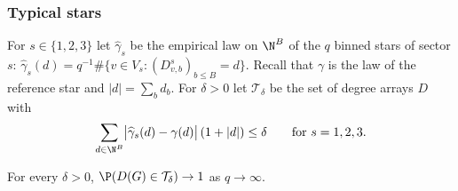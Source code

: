 \subsubsection*{Typical stars}
For $s\in\{1,2,3\}$ let $\widehat\gamma_s$ be the empirical law on $\N^B$ of the $q$ binned
stars of sector $s$: $\widehat\gamma_s(d)=q^{-1}\#\{v\in V_s:(D^s_{v,b})_{b\le B}=d\}$.
Recall that $\gamma$ is the law of the reference star and $|d|=\sum_bd_b$. For $\delta>0$
let $\mathcal{T}_\delta$ be the set of degree arrays $D$ with
\begin{equation}\label{eq:iid-typical}
\sum_{d\in\N^B}\bigl|\widehat\gamma_s(d)-\gamma(d)\bigr|\,(1+|d|)\le\delta
\qquad\text{for }s=1,2,3 .
\end{equation}

\begin{lemma}\label{lem:iid-typical}
For every $\delta>0$, $\P(D(G)\in\mathcal{T}_\delta)\to1$ as $q\to\infty$.
\end{lemma}

